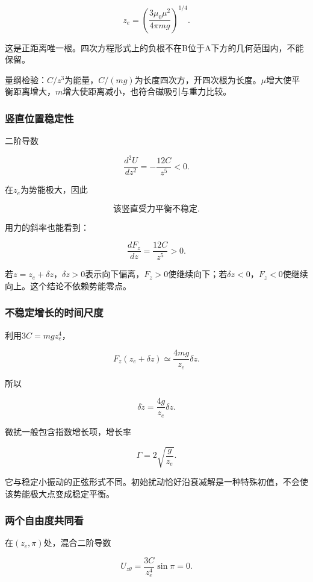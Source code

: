 \documentclass[12pt,a4paper,fontset=fandol]{ctexart}
\begin{document}
\[
\boxed{z_e=\left(\frac{3\mu_0\mu^2}{4\pi mg}\right)^{1/4}}.
\]

这是正距离唯一根。四次方程形式上的负根不在B位于A下方的几何范围内，不能保留。

量纲检验：\(C/z^3\)为能量，\(C/(mg)\)为长度四次方，开四次根为长度。\(\mu\)增大使平衡距离增大，\(m\)增大使距离减小，也符合磁吸引与重力比较。

\subsubsection{竖直位置稳定性}\label{ux7ad6ux76f4ux4f4dux7f6eux7a33ux5b9aux6027}

二阶导数

\[
\frac{d^2U}{dz^2}=-\frac{12C}{z^5}<0.
\]

在\(z_e\)为势能极大，因此

\[
\boxed{\text{该竖直受力平衡不稳定}}.
\]

用力的斜率也能看到：

\[
\frac{dF_z}{dz}=\frac{12C}{z^5}>0.
\]

若\(z=z_e+\delta z\)，\(\delta z>0\)表示向下偏离，\(F_z>0\)使继续向下；若\(\delta z<0\)，\(F_z<0\)使继续向上。这个结论不依赖势能零点。

\subsubsection{不稳定增长的时间尺度}\label{ux4e0dux7a33ux5b9aux589eux957fux7684ux65f6ux95f4ux5c3aux5ea6}

利用\(3C=mgz_e^4\)，

\[
F_z(z_e+\delta z)\simeq\frac{4mg}{z_e}\delta z.
\]

所以

\[
\delta\ddot z=\frac{4g}{z_e}\delta z.
\]

微扰一般包含指数增长项，增长率

\[
\Gamma=2\sqrt{\frac g{z_e}}.
\]

它与稳定小振动的正弦形式不同。初始扰动恰好沿衰减解是一种特殊初值，不会使该势能极大点变成稳定平衡。

\subsubsection{两个自由度共同看}\label{ux4e24ux4e2aux81eaux7531ux5ea6ux5171ux540cux770b}

在\((z_e,\pi)\)处，混合二阶导数

\[
U_{z\theta}=\frac{3C}{z_e^4}\sin\pi=0.
\]
\end{document}
